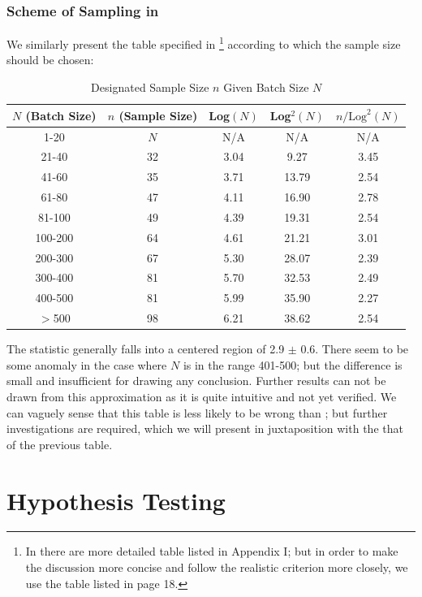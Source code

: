 \documentclass[12pt]{article}
\begin{document}
\subsubsection{Scheme of Sampling in \cite{OIML2016}}

We similarly present the table specified in \cite{OIML2016}\footnote{In \cite{OIML2016} there are more detailed table listed in Appendix I; but in order to make the discussion more concise and follow the realistic criterion more closely, we use the table listed in page 18.} according to which the sample size should be chosen:

\begin{table}[htbp]
    \centering
    \begin{tabular}{ccccc}
        \toprule
        $N$ (Batch Size) & $n$ (Sample Size) & Log$(N)$ & Log$^2(N)$ & $n/\text{Log}^2(N)$ \\
        \midrule
        1-20 & $N$ & N/A & N/A & N/A \\
        21-40   & 32 & 3.04 & 9.27  & 3.45 \\
        41-60   & 35 & 3.71 & 13.79 & 2.54 \\
        61-80   & 47 & 4.11 & 16.90 & 2.78 \\
        81-100  & 49 & 4.39 & 19.31 & 2.54 \\
        100-200 & 64 & 4.61 & 21.21 & 3.01 \\
        200-300 & 67 & 5.30 & 28.07 & 2.39 \\
        300-400 & 81 & 5.70 & 32.53 & 2.49 \\
        400-500 & 81 & 5.99 & 35.90 & 2.27 \\
        $>$500  & 98 & 6.21 & 38.62 & 2.54 \\
        \bottomrule
    \end{tabular}
    \caption{Designated Sample Size $n$ Given Batch Size $N$}
\end{table}

The statistic generally falls into a centered region of 2.9 $\pm$ 0.6. There seem to be some anomaly in the case where $N$ is in the range 401-500; but the difference is small and insufficient for drawing any conclusion. Further results can not be drawn from this approximation as it is quite intuitive and not yet verified. We can vaguely sense that this table is less likely to be wrong than \cite{JJF2005}; but further investigations are required, which we will present in juxtaposition with the that of the previous table. 

\section{Hypothesis Testing}
\end{document}
